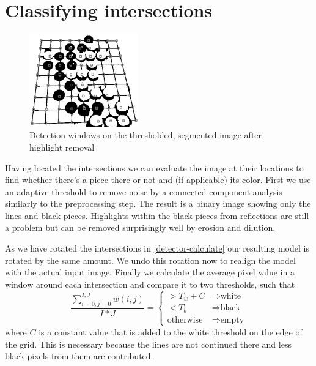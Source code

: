 	\vfill
	\pagebreak

	\section{Classifying intersections}
	\label{detector-classifying}
	\begingroup
	\setlength{\columnsep}{20pt}%
	\begin{figure}
		\centering
  		\vspace{-30pt}
	    \includegraphics[width=0.42\textwidth]{images/colorDetection.png}
	  	\caption{Detection windows on the thresholded, segmented image after highlight removal}
	\end{figure}
	Having located the intersections we can evaluate the image at their locations to find whether there's a piece there or not and (if applicable) its color. First we use an adaptive threshold to remove noise by a connected-component analysis similarly to the preprocessing step. The result is a binary image showing only the lines and black pieces. Highlights within the black pieces from reflections are still a problem but can be removed surprisingly well by erosion and dilution.

	\endgroup

	As we have rotated the intersections in \autoref{detector-calculate} our resulting model is rotated by the same amount. We undo this rotation now to realign the model with the actual input image. Finally we calculate the average pixel value in a window around each intersection and compare it to two thresholds, such that \begin{equation}
		\frac{\sum^{I,J}_{i=0,j=0}w(i,j)}{I*J} =
		\begin{cases}
		> T_{w} + C & \Rightarrow  \text{white}\\
		< T_{b} & \Rightarrow \text{black}\\
		\text{otherwise} & \Rightarrow \text{empty}
		\end{cases}
	\end{equation}
	where $C$ is a constant value that is added to the white threshold on the edge of the grid. This is necessary because the lines are not continued there and less black pixels from them are contributed.


